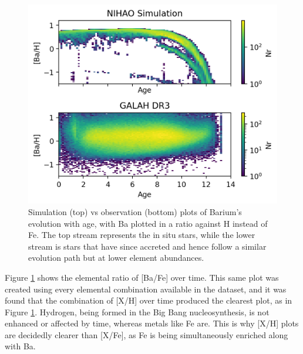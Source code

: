 \documentclass[fleqn,usenatbib]{mnras}
\begin{document}
\begin{figure}
	\includegraphics[width=\columnwidth]{Ba_H_time.png}
    \caption{Simulation (top) vs observation (bottom) plots of Barium's evolution with age, with Ba plotted in a ratio against H instead of Fe. The top stream represents the in situ stars, while the lower stream is stars that have since accreted and hence follow a similar evolution path but at lower element abundances.}
    \label{fig:BaHtime}
\end{figure}


Figure \ref{fig:BaHtime} shows the elemental ratio of [Ba/Fe] over time. This same plot was created using every elemental combination available in the dataset, and it was found that the combination of [X/H] over time produced the clearest plot, as in Figure \ref{fig:BaHtime}. Hydrogen, being formed in the Big Bang nucleosynthesis, is not enhanced or affected by time, whereas metals like Fe are. This is why [X/H] plots are decidedly clearer than [X/Fe], as Fe is being simultaneously enriched along with Ba. 
\end{document}
